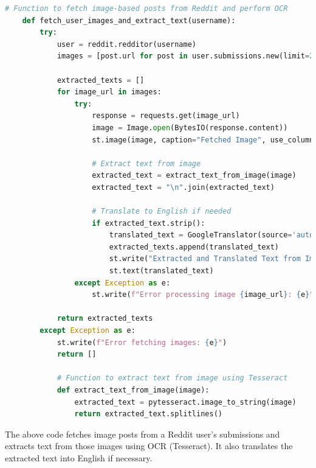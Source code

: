 \begin{tcolorbox}[colback=gray!5!white, colframe=gray!80!black, boxrule=0.5pt, title=Image OCR Functionality]
    \begin{lstlisting}[language=Python]
    # Function to fetch image-based posts from Reddit and perform OCR
    def fetch_user_images_and_extract_text(username):
        try:
            user = reddit.redditor(username)
            images = [post.url for post in user.submissions.new(limit=20) if post.url.endswith(('.jpg', '.jpeg', '.png', '.webp', '.bmp', '.tiff'))]
    
            extracted_texts = []
            for image_url in images:
                try:
                    response = requests.get(image_url)
                    image = Image.open(BytesIO(response.content))
                    st.image(image, caption="Fetched Image", use_column_width=True)
    
                    # Extract text from image
                    extracted_text = extract_text_from_image(image)
                    extracted_text = "\n".join(extracted_text)
    
                    # Translate to English if needed
                    if extracted_text.strip():
                        translated_text = GoogleTranslator(source='auto', target='en').translate(extracted_text)
                        extracted_texts.append(translated_text)
                        st.write("Extracted and Translated Text from Image:")
                        st.text(translated_text)
                except Exception as e:
                    st.write(f"Error processing image {image_url}: {e}")
    
            return extracted_texts
        except Exception as e:
            st.write(f"Error fetching images: {e}")
            return []

            # Function to extract text from image using Tesseract
            def extract_text_from_image(image):
                extracted_text = pytesseract.image_to_string(image)
                return extracted_text.splitlines()
    \end{lstlisting}
    \end{tcolorbox}
\noindent
The above code fetches image posts from a Reddit user's submissions and extracts text from those images using OCR (Tesseract). It also translates the extracted text into English if necessary.


